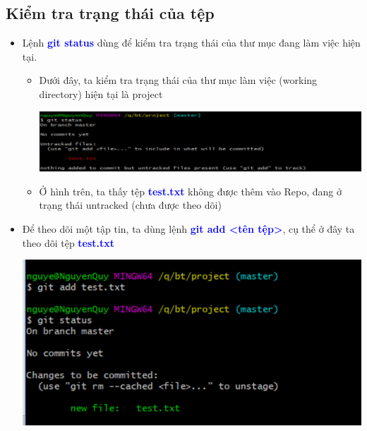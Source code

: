 \documentclass[12pt,a4paper]{report}
\begin{document}
\subsection{Kiểm tra trạng thái của tệp}
\begin{itemize}
\item Lệnh \textcolor{blue}{\bf git status} dùng để kiểm tra trạng thái của thư mục đang làm việc hiện tại.
	\begin{itemize}
		\item Dưới đây, ta kiểm tra trạng thái của thư mục làm việc (working directory) hiện tại là project

	\includegraphics[width=0.8\linewidth]{screenshot007}

	\label{fig:screenshot007}

		\item Ở hình trên, ta thấy tệp \textcolor{blue}{\bf test.txt} không được thêm vào Repo, đang ở trạng thái untracked (chưa được theo dõi)
	\end{itemize}
\item Để theo dõi một tập tin, ta dùng lệnh \textcolor{blue}{\bf git add <tên tệp>}, cụ thể ở đây ta theo dõi tệp \textcolor{blue}{\bf test.txt}

	\includegraphics[width=0.8\linewidth]{screenshot008}

	\label{fig:screenshot008}
\end{itemize}
\end{document}
